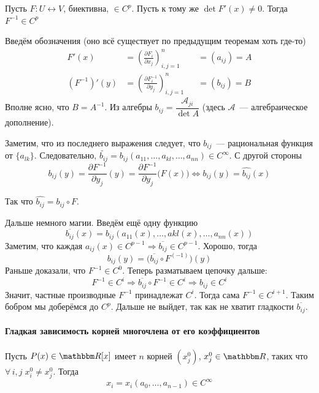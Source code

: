 \documentclass[12pt,timbord]{../../../notes}
\begin{document}
\begin{thrm}\label{thrm:diffspace::invsmooth}
  Пусть $F\colon U \leftrightarrow V$, биективна, $\in C^p$. Пусть к тому же $\det F'(x) \neq 0$.
  Тогда $F^{-1} \in C^p$
\end{thrm}
\begin{ittproof}
  Введём обозначения (оно всё существует по предыдущим теоремам хоть где-то)
  \[
    \begin{aligned}
      F'(x) &= \left(\frac{\partial F_i}{\partial x_j}\right)_{i,j=1}^n & &= (a_{ij}) = A \\
      (F^{-1})'(y) &= \left(\frac{\partial F^{-1}_i}{\partial y_j}\right)_{i,j=1}^n & &= (b_{ij}) = B 
    \end{aligned}
  \]
  Вполне ясно, что $B = A^{-1}$. Из алгебры $b_{ij} = \dfrac{\mathcal A_{ji}}{\det A}$ 
  (здесь $\mathcal A$~--- алгебраическое дополнение).
  
  Заметим, что из последнего выражения следует, что $b_{ij}$~--- рациональная функция от $\{a_{lk}\}$.
  Следовательно, $\widetilde{b_{ij}} = b_{ij}(a_{11}, \dotsc, a_{kl}, \dotsc, a_{nn}) \in C^\infty$.
  С другой стороны
  \[
    b_{ij}(y) = \frac{\partial F^{-1}}{\partial y_j}(y) = \frac{\partial F^{-1}}{\partial y_j}\bigl(F(x)\bigr)
    \Leftrightarrow b_{ij}(y) = \widehat{b_{ij}}(x)
  \]

  Так что $\widehat{b_{ij}} = b_{ij} \circ F$. 

  Дальше немного магии. Введём ещё одну функцию
  \[
    \overline{b_{ij}}(x) = b_{ij}(a_{11}(x), \dotsc, a{kl}(x), \dotsc, a_{nn}(x))   
  \]
  Заметим, что каждая $a_{ij}(x) \in C^{p-1} \Rightarrow \overline{b_{ij}} \in C^{p-1}$.
  Хорошо, тогда 
  \[
    b_{ij}(y) = \bigl(\overline{b_{ij}} \circ F^{(-1)}\bigr)(y) 
  \]
  Раньше доказали, что $F^{-1} \in C^0$. Теперь разматываем цепочку дальше:
  \[
    F^{-1} \in C^i \Rightarrow \overline{b_{ij}} \circ F^{-1} \in C^i \Rightarrow b_{ij} \in C^i 
  \]
  Значит, частные производные $F^{-1}$ принадлежат $C^i$. Тогда сама $F^{-1} \in C^{i+1}$.
  Таким бобром мы доберёмся до $C^p$. 
  Дальше не выйдет, так как не хватит гладкости $\overline{b_{ij}}$.
\end{ittproof}

\paragraph{Гладкая зависимость корней многочлена от его коэффициентов}
\label{par:diffspace::smoothpolyroots}

\begin{thrm}\label{thrm:diffspace::smoothpolyroots}
  Пусть $P(x) \in \R[x]$ имеет $n$ корней $(x^0_j)$,  $x^0_j \in \R$, таких что $\forall\, i,j \; x^0_i \neq x^0_j$.  
  Тогда 
  \[
    x_i = x_i(a_0, \dotsc, a_{n-1}) \in C^\infty
  \]
\end{thrm}
\end{document}

